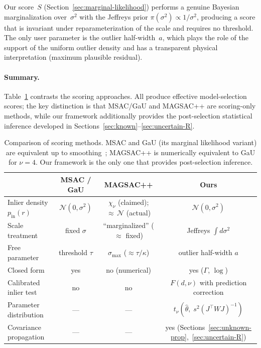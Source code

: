 \documentclass[11pt]{article}
\newcommand{\Normal}{\mathcal{N}}
\begin{document}
Our score~$S$ (Section~\ref{sec:marginal-likelihood}) performs a
genuine Bayesian marginalization over~$\sigma^2$ with the Jeffreys
prior $\pi(\sigma^2) \propto 1/\sigma^2$, producing a score that is
invariant under reparameterization of the scale and requires no
threshold.  The only user parameter is the outlier half-width~$a$,
which plays the role of the support of the uniform outlier density and
has a transparent physical interpretation (maximum plausible residual).

\paragraph{Summary.}
Table~\ref{tab:scoring-comparison} contrasts the scoring approaches.
All produce effective model-selection scores; the key distinction is
that MSAC/GaU and MAGSAC++ are scoring-only methods, while our
framework additionally provides the post-selection statistical
inference developed in
Sections~\ref{sec:known}--\ref{sec:uncertain-R}.

\begin{table}[ht]
\centering
\begin{tabular}{lccc}
  \toprule
  & MSAC / GaU & MAGSAC++ & Ours \\
  \midrule
  Inlier density $p_{\mathrm{in}}(r)$
    & $\Normal(0, \sigma^2)$
    & $\chi_\nu$ (claimed); ${\approx}\,\Normal$ (actual)
    & $\Normal(0, \sigma^2)$ \\[2pt]
  Scale treatment
    & fixed $\sigma$
    & ``marginalized'' ($\approx$ fixed)
    & Jeffreys $\int\! d\sigma^2$ \\[2pt]
  Free parameter
    & threshold $\tau$
    & $\sigma_{\max}$ ($\approx \tau/\kappa$)
    & outlier half-width $a$ \\[2pt]
  Closed form
    & yes
    & no (numerical)
    & yes ($\Gamma$, $\log$) \\[2pt]
  Calibrated inlier test
    & no
    & no
    & $F(d,\nu)$ with prediction correction \\[2pt]
  Parameter distribution
    & ---
    & ---
    & $t_\nu(\hat\theta,\; s^2(J^\top\!WJ)^{-1})$ \\[2pt]
  Covariance propagation
    & ---
    & ---
    & yes (Sections~\ref{sec:unknown-prop},~\ref{sec:uncertain-R}) \\
  \bottomrule
\end{tabular}
\caption{Comparison of scoring methods.  MSAC and GaU (its marginal
  likelihood variant) are equivalent up to
  smoothing~\cite{shekhovtsov2025scoring}; MAGSAC++ is numerically
  equivalent to GaU for $\nu = 4$.  Our framework is the only one
  that provides post-selection inference.}
\label{tab:scoring-comparison}
\end{table}
\end{document}
